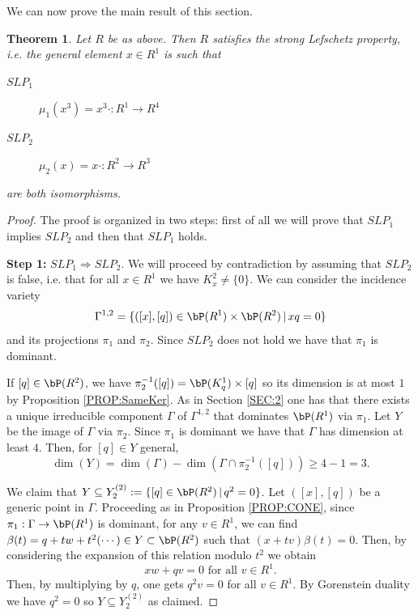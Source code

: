\documentclass[a4paper,11pt]{amsart}
\newtheorem{theorem}{Theorem}[section]
\begin{document}
We can now prove the main result of this section.

\begin{theorem}
Let $R$ be as above. Then $R$ satisfies the strong Lefschetz property, i.e. the general element $x\in R^1$ is such that
\begin{description}
\item [$SLP_1$] $\mu_1(x^3)=x^3\cdot :R^1\to R^4$
\item [$SLP_2$] $\mu_2(x)=x\cdot :R^2\to R^3$
\end{description}
are both isomorphisms.
\end{theorem}

\begin{proof}
The proof is organized in two steps: first of all we will prove that $SLP_1$ implies $SLP_2$ and then that $SLP_1$ holds.
\vspace{2mm}

{\bf Step 1:} $SLP_1 \Longrightarrow SLP_2$. We will proceed by contradiction by assuming that $SLP_2$ is false, i.e. that for all $x\in R^1$ we have $K^2_{x}\neq \{0\}$. We can consider the incidence variety 
$$\Gamma^{1,2}=\{([x],[q])\in \bP(R^1)\times \bP(R^2)\,|\, xq=0\}$$ 
and its projections $\pi_1$ and $\pi_2$. Since $SLP_2$ does not hold we have that $\pi_1$ is dominant.

If $[q]\in \bP(R^2)$, we have $\pi_2^{-1}([q])=\bP(K^1_q)\times [q]$ so its dimension is at most $1$ by Proposition \ref{PROP:SameKer}. As in Section \ref{SEC:2} one has that there exists a unique irreducible component $\Gamma$ of $\Gamma^{1,2}$ that dominates $\bP(R^1)$ via $\pi_1$. Let $Y$ be the image of $\Gamma$ via $\pi_2$.
Since $\pi_1$ is dominant we have that $\Gamma$ has dimension at least $4$. Then, for $[q]\in Y$ general,
$$\dim(Y)=\dim(\Gamma)-\dim(\Gamma\cap \pi_2^{-1}([q]))\geq 4-1=3.$$

We claim that $Y\subseteq Y_2^{(2)}:=\{[q]\in \bP(R^2)\,|\, q^2=0\}$. Let $([x],[q])$ be a generic point in $\Gamma$. Proceeding as in Proposition \ref{PROP:CONE}, since $\pi_1:\Gamma\to \bP(R^1)$ is dominant, for any $v\in R^1$, we can find $\beta(t)=q+tw+t^2(\cdots)\in Y\subset \bP(R^2)$ such that $(x+tv)\beta(t)=0$. Then, by considering the expansion of this relation modulo $t^2$ we obtain 
\begin{equation}
\label{EQ:KC1}
xw+qv=0 \mbox{ for all } v\in R^1.
\end{equation}
Then, by multiplying by $q$, one gets $q^2v=0$ for all $v\in R^1$. By Gorenstein duality we have $q^2=0$ so $Y\subseteq Y_2^{(2)}$ as claimed.


\end{proof}
\end{document}
